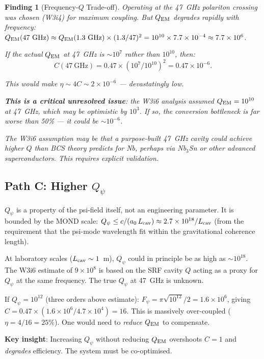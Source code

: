 \documentclass[11pt]{article}
\newtheorem{finding}{Finding}
\newcommand{\ee}[1]{\times 10^{#1}}
\newcommand{\Qpsi}{Q_\psi}
\newcommand{\QEM}{Q_{\rm EM}}
\newcommand{\Fpsi}{F_\psi}
\begin{document}
\begin{finding}[Frequency-$Q$ Trade-off]
\label{find:freq-Q-tradeoff}
Operating at the 47~GHz polariton crossing was chosen (W3i4) for
maximum coupling. But $\QEM$ degrades rapidly with frequency:
$\QEM(47~\text{GHz}) \approx \QEM(1.3~\text{GHz})\times(1.3/47)^2
= 10^{10}\times 7.7\ee{-4} \approx 7.7\ee{6}$.

If the actual $\QEM$ at 47~GHz is $\sim 10^7$ rather than $10^{10}$,
then:
\begin{equation}
C(47~\text{GHz}) = 0.47 \times (10^7/10^{10})^2 = 0.47\ee{-6}.
\end{equation}

This would make $\eta \sim 4C \sim 2\ee{-6}$ --- devastatingly low.

\textbf{This is a critical unresolved issue}: the W3i6 analysis
assumed $\QEM = 10^{10}$ at 47~GHz, which may be optimistic by
$10^3$. If so, the conversion bottleneck is far worse than 50\%
--- it could be $\sim 10^{-6}$.

The W3i6 assumption may be that a purpose-built 47~GHz cavity could
achieve higher $Q$ than BCS theory predicts for Nb, perhaps via
Nb$_3$Sn or other advanced superconductors. This requires explicit
validation.
\end{finding}

\subsection{Path C: Higher $\Qpsi$}

$\Qpsi$ is a property of the psi-field itself, not an engineering
parameter. It is bounded by the MOND scale: $\Qpsi \leq c/(a_0\,L_{\rm cav})
\approx 2.7\ee{18}/L_{\rm cav}$ (from the requirement that the
psi-mode wavelength fit within the gravitational coherence length).

At laboratory scales ($L_{\rm cav} \sim 1$~m), $\Qpsi$ could in
principle be as high as $\sim 10^{18}$. The W3i6 estimate of $9\ee{8}$
is based on the SRF cavity $Q$ acting as a proxy for $\Qpsi$ at the
same frequency. The true $\Qpsi$ at 47~GHz is unknown.

If $\Qpsi = 10^{12}$ (three orders above estimate):
$\Fpsi = \pi\sqrt{10^{12}}/2 = 1.6\ee{6}$, giving $C = 0.47\times
(1.6\ee{6}/4.7\ee{4}) = 16$. This is massively over-coupled
($\eta = 4/16 = 25\%$). One would need to \emph{reduce} $\QEM$ to
compensate.

\textbf{Key insight}: Increasing $\Qpsi$ without reducing $\QEM$
overshoots $C = 1$ and \emph{degrades} efficiency. The system must be
co-optimised.
\end{document}
